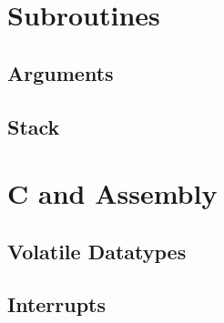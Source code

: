 \documentclass[12pt,letterpaper]{article} \usepackage{amsmath} \usepackage{graphicx} \usepackage[margin=1in]{geometry} \usepackage{longtable}  \usepackage{amssymb}
\begin{document}
	\section{Subroutines}
	
	\subsection{Arguments}
	
	\subsection{Stack}
	
	\section{C and Assembly}
	
	\subsection{Volatile Datatypes}
	
	\subsection{Interrupts}
	
	
	
	
\end{document}
